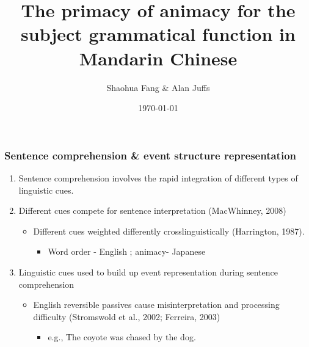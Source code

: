 \documentclass{beamer}
\title[Short title]{The primacy of animacy for the subject grammatical function in Mandarin Chinese} %
\author{Shaohua Fang \& Alan Juffs} %
\institute[PITT] %
{
University of Pittsburgh \\ %
\medskip
\textit{shf64@pitt.edu} %
}
\date{\today} %
\begin{document}
\begin{frame}
\titlepage %
\end{frame}





\begin{frame}
\frametitle{Sentence comprehension \& event structure representation}

\begin{enumerate}
    \pause
    \item Sentence comprehension involves the rapid integration of different types of linguistic cues.
    \pause
   \setlength{\parskip}{1em}
   \pause
   \item Different cues compete for sentence interpretation (MacWhinney, 2008)
 
   \pause
   \begin{itemize}
   \pause
     \item Different cues weighted differently crosslinguistically (Harrington, 1987).
     \pause
     \begin{itemize}
     \pause
        \item Word order - English ; animacy- Japanese
        \pause
     \end{itemize}
   \end{itemize}
   \pause
   \item Linguistic cues used to build up event representation during sentence comprehension \Rightarrow {}
   
    \pause
    \begin{itemize}
    \pause
        \item English reversible passives cause misinterpretation and processing difficulty (Stromswold et al., 2002; Ferreira, 2003)
            \pause
            \begin{itemize}
            \pause
            \item e.g., The coyote was chased by the dog.
            \pause
            \end{itemize}
   \end{itemize}
\end{enumerate}

\end{frame}
\end{document}
